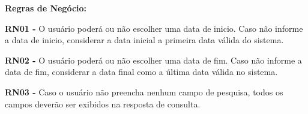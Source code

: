 \begin{mdframed}
\begin{flushleft}
    \textbf{Regras de Negócio:}
		\item[] \textbf{RN01 - } O usuário poderá ou não escolher uma data de inicio. Caso não informe a data de inicio, considerar a data inicial a primeira data válida do sistema.
		\item[] \textbf{RN02 - } O usuário poderá ou não escolher uma data de fim. Caso não informe a data de fim, considerar a data final como a última data válida no sistema.
		\item[] \textbf{RN03 - } Caso o usuário não preencha nenhum campo de pesquisa, todos os campos deverão ser exibidos na resposta de consulta.
		\end{flushleft}

	\end{mdframed}



